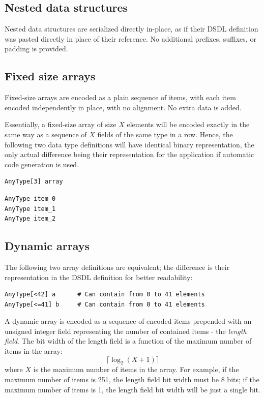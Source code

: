 \subsection{Nested data structures}

Nested data structures are serialized directly in-place,
as if their DSDL definition was pasted directly in place of their reference.
No additional prefixes, suffixes, or padding is provided.

\subsection{Fixed size arrays}

Fixed-size arrays are encoded as a plain sequence of items,
with each item encoded independently in place, with no alignment.
No extra data is added.

Essentially, a fixed-size array of size $X$ elements will be encoded exactly in the same way
as a sequence of $X$ fields of the same type in a row.
Hence, the following two data type definitions will have identical binary representation,
the only actual difference being their representation for the application
if automatic code generation is used.

\begin{verbatim}
AnyType[3] array
\end{verbatim}

\begin{verbatim}
AnyType item_0
AnyType item_1
AnyType item_2
\end{verbatim}

\subsection{Dynamic arrays}

The following two array definitions are equivalent;
the difference is their representation in the DSDL definition for better readability:
\begin{verbatim}
AnyType[<42] a      # Can contain from 0 to 41 elements
AnyType[<=41] b     # Can contain from 0 to 41 elements
\end{verbatim}

A dynamic array is encoded as a sequence of encoded items prepended with an unsigned
integer field representing the number of contained items - the \emph{length field}.
The bit width of the length field is a function of the maximum number of items in the array:
$$\lceil{}\log_2 (X + 1)\rceil{}$$
where $X$ is the maximum number of items in the array.
For example, if the maximum number of items is 251, the length field bit width must be 8 bits;
if the maximum number of items is 1, the length field bit width will be just a single bit.

